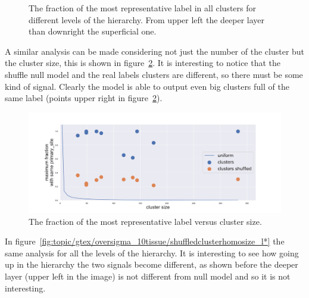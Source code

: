 \begin{figure}[htb!]
\begin{minipage}{0.45\textwidth}
    \end{minipage}
    \caption{The fraction of the most representative label in all clusters for different levels of the hierarchy. From upper left the deeper layer than downright the superficial one.}
    \label{fig:topic/gtex/oversigma_10tissue/shuffledcluster_maximum*}
\end{figure}
\FloatBarrier
A similar analysis can be made considering not just the number of the cluster but the cluster size, this is shown in figure~\ref{fig:topic/gtex/oversigma_10tissue/shuffledclusterhomosize_l3_primary_site}. It is interesting to notice that the shuffle null model and the real labels clusters are different, so there must be some kind of signal. Clearly the model is able to output even big clusters full of the same label (points upper right in figure~\ref{fig:topic/gtex/oversigma_10tissue/shuffledclusterhomosize_l3_primary_site}).
\begin{figure}[htb!]
	\centering
	\includegraphics[width=0.9\linewidth]{pictures/topic/gtex/oversigma_10tissue/shuffledclusterhomosize_l3_primary_site.pdf}
	\caption{The fraction of the most representative label versus cluster size.}
	\label{fig:topic/gtex/oversigma_10tissue/shuffledclusterhomosize_l3_primary_site}
\end{figure}
In figure~\ref{fig:topic/gtex/oversigma_10tissue/shuffledclusterhomosize_l*} the same analysis for all the levels of the hierarchy. It is interesting to see how going up in the hierarchy the two signals become different, as shown before the deeper layer (upper left in the image) is not different from null model and so it is not interesting.
